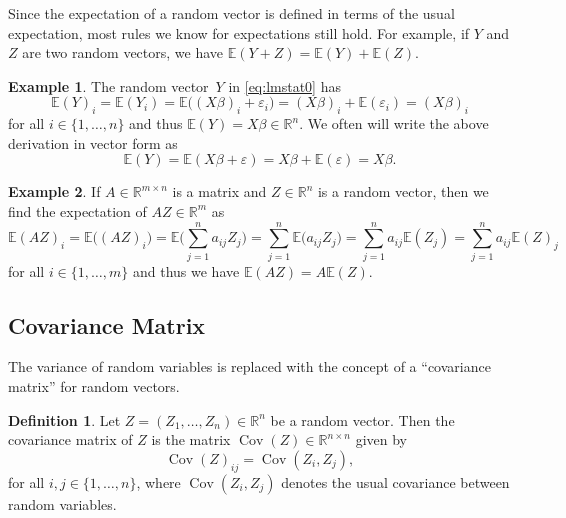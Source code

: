 \documentclass[
  a4paper,
]{article}
\theoremstyle{definition}
\newtheorem{definition}{Definition}[section]
\theoremstyle{definition}
\newtheorem{example}{Example}[section]
\theoremstyle{definition}
\theoremstyle{definition}
\theoremstyle{remark}
\begin{document}
Since the expectation of a random vector is defined in terms of the
usual expectation, most rules we know for expectations still hold.
For example, if \(Y\) and \(Z\) are two random vectors, we have
\(\mathbb{E}(Y+Z) = \mathbb{E}(Y) + \mathbb{E}(Z)\).

\begin{example}
\protect\hypertarget{exm:E-of-Y}{}\label{exm:E-of-Y}The random vector~\(Y\) in \eqref{eq:lmstat0} has
\begin{equation*}
    \mathbb{E}(Y)_i
    = \mathbb{E}(Y_i)
    = \mathbb{E}\bigl( (X\beta)_i + \varepsilon_i \bigr)
    = (X\beta)_i + \mathbb{E}(\varepsilon_i)
    = (X\beta)_i
  \end{equation*}
for all \(i \in \{1, \ldots, n\}\) and thus \(\mathbb{E}(Y) = X\beta \in \mathbb{R}^n\).
We often will write the above derivation in vector form
as
\begin{equation*}
    \mathbb{E}(Y)
    = \mathbb{E}(X\beta + \varepsilon)
    = X\beta + \mathbb{E}(\varepsilon)
    = X\beta.
  \end{equation*}
\end{example}

\begin{example}
If \(A \in \mathbb{R}^{m\times n}\) is a matrix and \(Z \in \mathbb{R}^n\) is a random
vector, then we find the expectation of \(AZ\in\mathbb{R}^m\) as
\begin{equation*}
    \mathbb{E}(AZ)_i
    = \mathbb{E}\bigl( (AZ)_i \bigr)
    = \mathbb{E}\bigl( \sum_{j=1}^n a_{ij} Z_j \bigr)
    = \sum_{j=1}^n \mathbb{E}\bigl( a_{ij} Z_j \bigr)
    = \sum_{j=1}^n a_{ij} \mathbb{E}(Z_j)
    = \sum_{j=1}^n a_{ij} \mathbb{E}(Z)_j
  \end{equation*}
for all \(i \in \{1, \ldots, m\}\) and thus we have \(\mathbb{E}(AZ) = A \mathbb{E}(Z)\).
\end{example}

\subsection{Covariance Matrix}\label{sec:covariance}

The variance of random variables is replaced with the concept of
a ``covariance matrix'' for random vectors.

\begin{definition}
Let \(Z = (Z_1, \ldots, Z_n) \in \mathbb{R}^n\) be a random vector.
Then the covariance matrix of \(Z\) is the matrix \(\mathop{\mathrm{Cov}}(Z) \in \mathbb{R}^{n\times n}\)
given by
\begin{equation*}
    \mathop{\mathrm{Cov}}(Z)_{ij}
    = \mathop{\mathrm{Cov}}(Z_i, Z_j),
  \end{equation*}
for all \(i, j \in \{1, \ldots, n\}\),
where \(\mathop{\mathrm{Cov}}(Z_i, Z_j)\) denotes the usual covariance between random
variables.
\end{definition}
\end{document}
